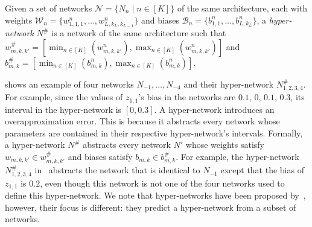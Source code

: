 \begin{definition}\label{over:Hyper}
Given a set of networks $\mathcal{N}=\{N_n \mid n\in [K]\}$ of the same architecture, each with weights $\mathcal{W}_{n} = \{w^n_{1,1,1},\ldots,w^n_{L,k_L,k_{L-1}}\}$ and biases $\mathcal{B}_{n}=\{b^n_{1,1},\ldots,b^n_{L,k_L}\}$, a \emph{hyper-network} $N^\#$ is a network of the same architecture such that $w_{m,k,k'}^\# = [\min_{n\in[K]}(w^n_{m,k,k'}), \max_{n\in[K]}(w^n_{m,k,k'})]$ and $b_{m,k}^\#=[\min_{n\in[K]}(b^n_{m,k}),\max_{n\in[K]}(b^n_{m,k})]$.
\end{definition}

 shows an example of four networks $N_{-1},\ldots,N_{-4}$ and their hyper-network $N^\#_{1,2,3,4}$. For example, since the values of $z_{1,1}$'s bias in the networks are $0.1$, $0$, $0.1$, $0.3$, its interval in the hyper-network is $[0,0.3]$.
A hyper-network introduces an overapproximation error. This is because it abstracts every network whose parameters are contained in their respective hyper-network's intervals. Formally, a hyper-network $N^\#$ abstracts every network $N'$ whose weights satisfy $w_{m,k,k'}\in w_{m,k,k'}^\#$ and biases satisfy $b_{m,k}\in b_{m,k}^\#$. For example, the hyper-network $N^\#_{1,2,3,4}$ in~ abstracts the network that is identical to $N_{-1}$ except that the bias of $z_{1,1}$ is $0.2$, even though this network is not one of the four networks used to define this hyper-network. 
 We note that hyper-networks have been proposed by~\citet{ref_8}, however, their focus is different: they predict a hyper-network from a subset of networks.
 
